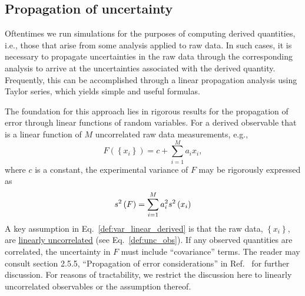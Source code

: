 \subsection{Propagation of uncertainty}

Oftentimes we run simulations for the purposes of computing derived quantities, i.e., those that arise from some analysis applied to raw data.  In such cases, it is necessary to propagate uncertainties in the raw data through the corresponding analysis to arrive at the uncertainties associated with the derived quantity.  Frequently, this can be accomplished through a linear propagation analysis using Taylor series, which yields simple and useful formulas.

The foundation for this approach lies in rigorous results for the propagation of error through linear functions of random variables.
For a derived observable that is a linear function of $M$ uncorrelated raw data measurements, e.g.,
%
\begin{equation}
  F\left( \left\{x_i\right\} \right) = c + \sum_{i=1}^M a_i x_i,
  \label{def:linear_derived_obs}
\end{equation}
%
where $c$ is a constant, the experimental variance of $F$ may be rigorously expressed as\cite{NIST_Sematech_eHandbook}
%
\begin{equation}
  s^2\left( F \right) = \sum_{i=1}^M a_i^2 s^2\left( x_i \right)
  \label{def:var_linear_derived}
\end{equation}
%
A key assumption in Eq.~\ref{def:var_linear_derived} is that the raw data, $\left\{x_i\right\}$, are \hyperref[def:unc_obs]{linearly uncorrelated} (see Eq.~\ref{def:unc_obs}). If any observed quantities are correlated, the uncertainty in $F$ must include ``covariance'' terms. The reader may consult section 2.5.5, ``Propagation of error considerations'' in Ref.~\cite{NIST_Sematech_eHandbook} for further discussion. For reasons of tractability, we restrict the discussion here to linearly uncorrelated observables or the assumption thereof.

